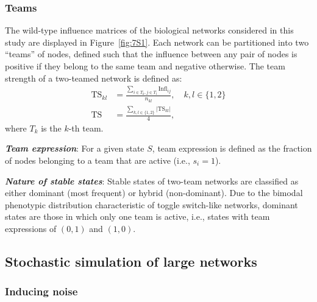 \documentclass[11pt]{article}
\newcommand{\ts}{\mathrm{TS}}
\newcommand{\inm}{\mathrm{Infl}}
\begin{document}
\subsubsection{Teams}
The wild-type influence matrices of the biological networks considered in this study are displayed in Figure~\ref{fig:7S1}. Each network can be partitioned into two ``teams'' of nodes, defined such that the influence between any pair of nodes is positive if they belong to the same team and negative otherwise. The team strength of a two-teamed network is defined as:
\begin{align} \label{eq:ts_def}
    \ts_{kl} &= \frac{\sum_{i \in T_k, j \in T_l} \inm_{ij}}{n_{kl}}, \quad k, l \in \{1, 2\} \\
    \ts &= \frac{\sum_{k,l \in \{1,2\}} |\ts_{kl}|}{4},
\end{align}
where $T_k$ is the $k$-th team.

\noindent\textbf{\textit{Team expression}}\label{text:team_exp}: For a given state $S$, team expression is defined as the fraction of nodes belonging to a team that are active (i.e., $s_i = 1$).


\noindent\textbf{\textit{Nature of stable states}}: Stable states of two-team networks are classified as either dominant (most frequent) or hybrid (non-dominant). Due to the bimodal phenotypic distribution characteristic of toggle switch-like networks, dominant states are those in which only one team is active, i.e., states with team expressions of $(0,1)$ and $(1,0)$.

\subsection{Stochastic simulation of large networks}

\subsubsection{Inducing noise}\label{sssec:noise_def}
\end{document}
